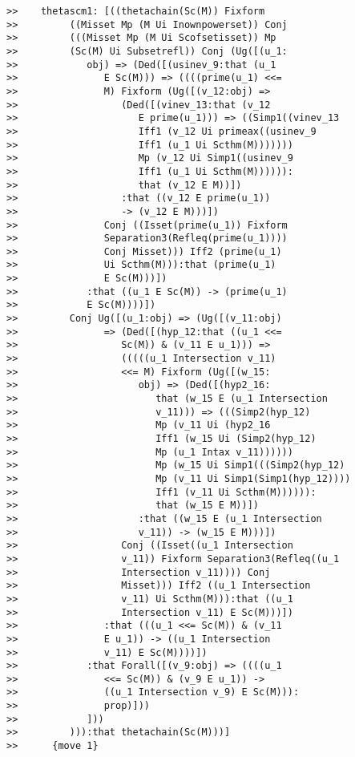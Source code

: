 \documentclass[12pt]{article}
\begin{document}
\begin{verbatim}
>>    thetascm1: [((thetachain(Sc(M)) Fixform
>>         ((Misset Mp (M Ui Inownpowerset)) Conj
>>         (((Misset Mp (M Ui Scofsetisset)) Mp
>>         (Sc(M) Ui Subsetrefl)) Conj (Ug([(u_1:
>>            obj) => (Ded([(usinev_9:that (u_1
>>               E Sc(M))) => ((((prime(u_1) <<=
>>               M) Fixform (Ug([(v_12:obj) =>
>>                  (Ded([(vinev_13:that (v_12
>>                     E prime(u_1))) => ((Simp1((vinev_13
>>                     Iff1 (v_12 Ui primeax((usinev_9
>>                     Iff1 (u_1 Ui Scthm(M)))))))
>>                     Mp (v_12 Ui Simp1((usinev_9
>>                     Iff1 (u_1 Ui Scthm(M)))))):
>>                     that (v_12 E M))])
>>                  :that ((v_12 E prime(u_1))
>>                  -> (v_12 E M)))])
>>               Conj ((Isset(prime(u_1)) Fixform
>>               Separation3(Refleq(prime(u_1))))
>>               Conj Misset))) Iff2 (prime(u_1)
>>               Ui Scthm(M))):that (prime(u_1)
>>               E Sc(M)))])
>>            :that ((u_1 E Sc(M)) -> (prime(u_1)
>>            E Sc(M))))])
>>         Conj Ug([(u_1:obj) => (Ug([(v_11:obj)
>>               => (Ded([(hyp_12:that ((u_1 <<=
>>                  Sc(M)) & (v_11 E u_1))) =>
>>                  (((((u_1 Intersection v_11)
>>                  <<= M) Fixform (Ug([(w_15:
>>                     obj) => (Ded([(hyp2_16:
>>                        that (w_15 E (u_1 Intersection
>>                        v_11))) => (((Simp2(hyp_12)
>>                        Mp (v_11 Ui (hyp2_16
>>                        Iff1 (w_15 Ui (Simp2(hyp_12)
>>                        Mp (u_1 Intax v_11))))))
>>                        Mp (w_15 Ui Simp1(((Simp2(hyp_12)
>>                        Mp (v_11 Ui Simp1(Simp1(hyp_12))))
>>                        Iff1 (v_11 Ui Scthm(M)))))):
>>                        that (w_15 E M))])
>>                     :that ((w_15 E (u_1 Intersection
>>                     v_11)) -> (w_15 E M)))])
>>                  Conj ((Isset((u_1 Intersection
>>                  v_11)) Fixform Separation3(Refleq((u_1
>>                  Intersection v_11)))) Conj
>>                  Misset))) Iff2 ((u_1 Intersection
>>                  v_11) Ui Scthm(M))):that ((u_1
>>                  Intersection v_11) E Sc(M)))])
>>               :that (((u_1 <<= Sc(M)) & (v_11
>>               E u_1)) -> ((u_1 Intersection
>>               v_11) E Sc(M))))])
>>            :that Forall([(v_9:obj) => ((((u_1
>>               <<= Sc(M)) & (v_9 E u_1)) ->
>>               ((u_1 Intersection v_9) E Sc(M))):
>>               prop)]))
>>            ]))
>>         ))):that thetachain(Sc(M)))]
>>      {move 1}




\end{verbatim}
\end{document}
